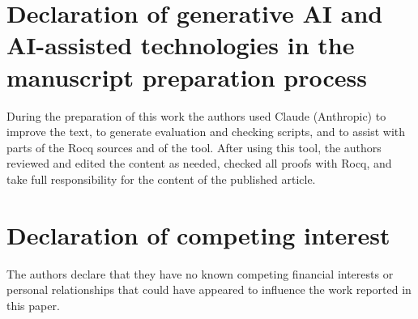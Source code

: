 \documentclass[preprint,12pt]{elsarticle}
\begin{document}
\section*{Declaration of generative AI and AI-assisted technologies in the manuscript preparation process}
During the preparation of this work the authors used Claude (Anthropic) to improve the text, to generate evaluation and checking scripts, and to assist with parts of the Rocq sources and of the tool. After using this tool, the authors reviewed and edited the content as needed, checked all proofs with Rocq, and take full responsibility for the content of the published article.

\section*{Declaration of competing interest}
The authors declare that they have no known competing financial interests or personal relationships that could have appeared to influence the work reported in this paper.



\end{document}
